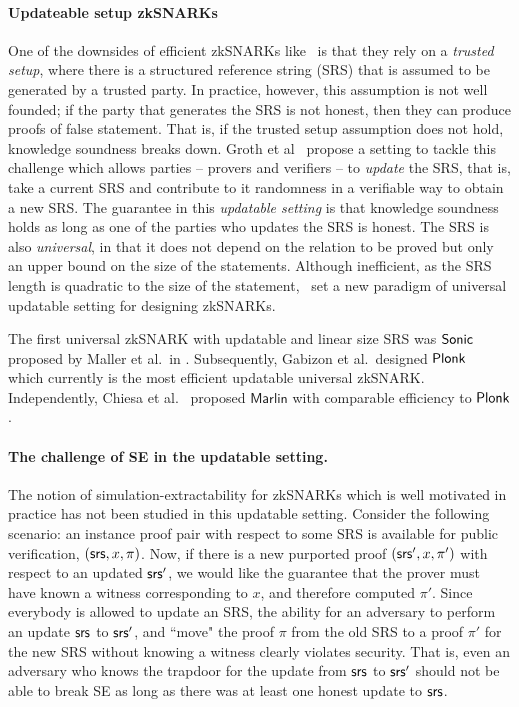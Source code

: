 \paragraph{Updateable setup zkSNARKs}
One of the downsides of efficient zkSNARKs like~\cite{AC:Groth10a,TCC:Lipmaa12,EC:GGPR13,SP:PHGR13,AC:Lipmaa13,AC:DFGK14,EC:Groth16} is that they rely on a \textit{trusted setup}, where there is a structured reference string (SRS) that is assumed to be generated by a trusted party. In practice, however, this assumption is not well founded; if the party that generates the SRS is not honest, then they can produce proofs of false statement. That is, if the trusted setup assumption does not hold, knowledge soundness breaks down.
Groth et al~\cite{C:GKMMM18} propose a setting to tackle this challenge which allows parties -- provers and verifiers -- to \emph{update} the SRS, that is, take a current SRS and contribute to it randomness in a verifiable way to obtain a new SRS. The guarantee in this \textit{updatable setting} is that knowledge soundness holds as long as one of the parties who updates the SRS is honest. The SRS is also \emph{universal}, in that it does not depend on the relation to be proved but only an upper bound on the size of the statements.
Although inefficient, as the SRS length is quadratic to the size of the statement,~\cite{C:GKMMM18} set a new
paradigm of universal updatable setting for designing zkSNARKs.

The first universal zkSNARK with updatable and linear size SRS was
${\textnormal{\textsf{Sonic}}}$ proposed by Maller et al.~in \cite{CCS:MBKM19}. Subsequently, Gabizon et
al.~designed $\textnormal{\textsf{Plonk}}$~\cite{EPRINT:GabWilCio19} which currently is the
most efficient updatable universal zkSNARK. Independently, Chiesa et
al.~\cite{EC:CHMMVW20} proposed $\textsf{Marlin}$ with comparable efficiency to
$\textnormal{\textsf{Plonk}}$.

\paragraph{The challenge of SE in the updatable setting.}

The notion of simulation-extractability for zkSNARKs which is well motivated in practice has not been studied in this updatable setting. 
Consider the following scenario: an instance proof pair with respect to some SRS is available for public verification, $(\mathsf{srs},x,\pi)$. Now, if there is a new purported proof $(\mathsf{srs}',x,\pi')$ with respect to an updated $\mathsf{srs}'$, we would like the guarantee that the prover must have known a witness corresponding to $x$, and therefore computed $\pi'$. Since everybody is allowed to update an SRS, the ability for an adversary to perform an update $\mathsf{srs}$ to $\mathsf{srs}'$, and ``move" the proof $\pi$ from the old SRS to a proof $\pi'$ for the new SRS without knowing a witness clearly violates security. That is, even an adversary who knows the trapdoor for the update from $\mathsf{srs}$ to $\mathsf{srs}'$ should not be able to break SE as long as there was at least one honest update to $\mathsf{srs}$.

